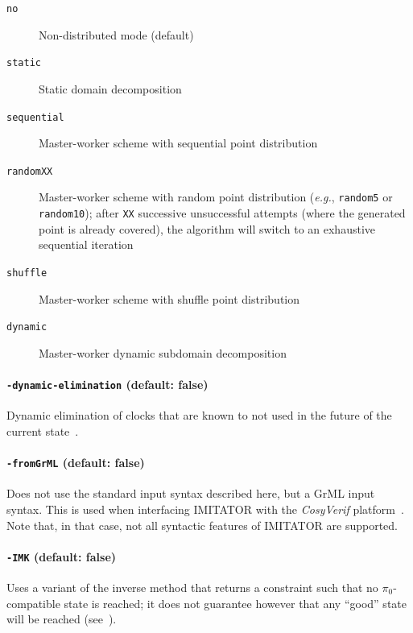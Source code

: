 \documentclass[a4paper,11pt]{report}
\makeatletter
\newcommand{\pio}{\pi_0}
\newcommand{\CosyVerif}{\emph{CosyVerif}}
\newcommand{\imitator}{\textsf{IMITATOR}}
\newcommand{\styleOption}[1]{\textcolor{optioncolor}{\texttt{#1}}}
\newcommand{\eg}{\textcolor{colorok}{\textit{e.g.},\@}}
\makeatother
\begin{document}
\begin{description}
	\item[\styleOption{no}] Non-distributed mode (default)
	\item[\styleOption{static}] Static domain decomposition \cite{ACN15}
	\item[\styleOption{sequential}] Master-worker scheme with sequential point distribution \cite{ACE14}
	\item[\styleOption{randomXX}] Master-worker scheme with random point distribution (\eg{} \styleOption{random5} or \styleOption{random10}); after \styleOption{XX} successive unsuccessful attempts (where the generated point is already covered), the algorithm will switch to an exhaustive sequential iteration \cite{ACE14}
	\item[\styleOption{shuffle}] Master-worker scheme with shuffle point distribution \cite{ACN15}
	\item[\styleOption{dynamic}] Master-worker dynamic subdomain decomposition \cite{ACN15}
\end{description}




\paragraph{\styleOption{-dynamic-elimination} (default: false)}
Dynamic elimination of clocks that are known to not used in the future of the current state~\cite{Andre13FSFMA}.




\paragraph{\styleOption{-fromGrML} (default: false)}

Does not use the standard input syntax described here, but a GrML input syntax.
This is used when interfacing \imitator{} with the \CosyVerif{} platform~\cite{AHHKLLP13}.
Note that, in that case, not all syntactic features of \imitator{} are supported.



\paragraph{\styleOption{-IMK} (default: false)}
Uses a variant of the inverse method that returns a constraint such that no $\pio$-compatible state is reached; it does not guarantee however that any ``good'' state will be reached (see~\cite{AS13}).
\end{document}
